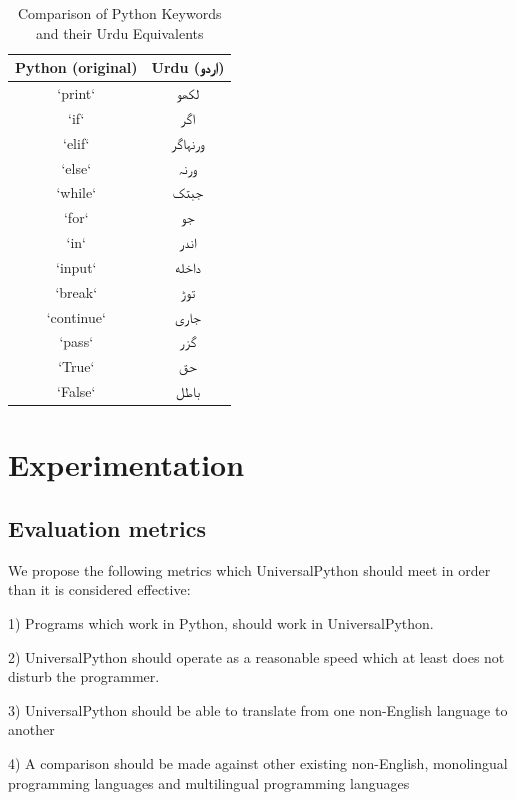 \documentclass[conference]{IEEEtran}
\begin{document}
\begin{table}[h]
    \centering
    \begin{tabular}{|c|c|}
    \hline
    Python (original) & Urdu (\texturdu{اردو}) \\
    \hline
    `print` & \texturdu{لکھو} \\
    `if` & \texturdu{اگر} \\
    `elif` & \texturdu{ورنہاگر} \\
    `else` & \texturdu{ورنہ} \\
    `while` & \texturdu{جبتک} \\
    `for` & \texturdu{جو} \\
    `in` & \texturdu{اندر} \\
    `input` & \texturdu{داخله} \\
    `break` & \texturdu{توڑ} \\
    `continue` & \texturdu{جاری} \\
    `pass` & \texturdu{گزر} \\
    `True` & \texturdu{حق} \\
    `False` & \texturdu{باطل} \\
    \hline
    \end{tabular}
    \caption{Comparison of Python Keywords and their Urdu Equivalents}
    \label{tab:python_urdu}
    \end{table}

    
\section{Experimentation}

\subsection{Evaluation metrics}\label{AA}

We propose the following metrics which UniversalPython should meet in order than it is considered effective:

1) Programs which work in Python, should work in UniversalPython.

2) UniversalPython should operate as a reasonable speed which at least does not disturb the programmer.

3) UniversalPython should be able to translate from one non-English language to another

4) A comparison should be made against other existing non-English, monolingual programming languages and multilingual programming languages
\end{document}
